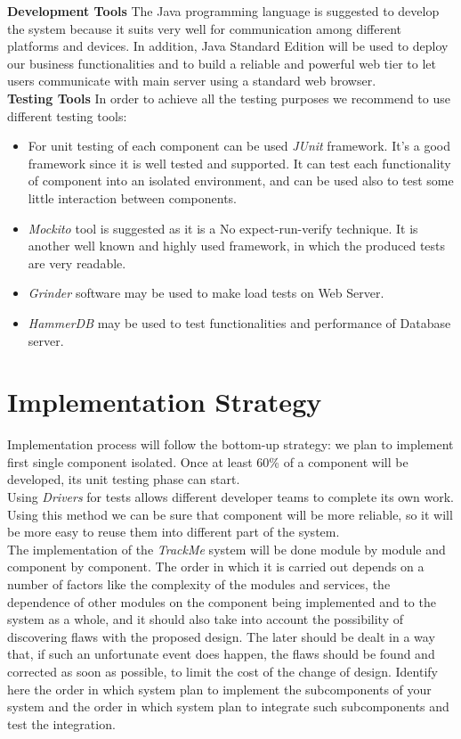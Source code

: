 \documentclass[a4paper, hidelinks, 12pt]{report}
\begin{document}
\textbf{Development Tools} The Java programming language is suggested to develop the system because it suits very well for communication among different platforms and devices. In addition, Java Standard Edition will be used to deploy our business functionalities and to build a reliable and powerful web tier to let users communicate with main server using a standard web browser. \\

\textbf{Testing Tools} In order to achieve all the testing purposes we recommend to use different testing tools:
\begin{itemize}
\item{} For unit testing of each component can be used \textit{JUnit} framework. It’s a good framework since it is well tested and supported. It can test each functionality of component into an isolated environment, and can be used also to test some little interaction between components.
\item{}\textit{Mockito} tool is suggested as it is a No expect-run-verify technique. It is another well known and highly used framework, in which the produced tests are very readable.
\item{} \textit{Grinder} software may be used to make load tests on Web Server.
\item{} \textit{HammerDB} may be used to test functionalities and performance of Database server.
\end{itemize}

\section{Implementation Strategy}
Implementation process will follow the bottom-up strategy: we plan to implement first single component isolated. Once at least 60\% of a component will be developed, its unit testing phase can start.\\

Using \textit{Drivers} for tests allows different developer teams to complete its own work. Using this method we can be sure that component will be more reliable, so it will be more easy to reuse them into different part of the system.\\

The implementation of the \textit{TrackMe} system will be done module by module and component by component. The order in which it is carried out depends on a number of factors like the complexity of the modules and services, the dependence of other modules on the component being implemented and to the system as a whole, and it should also take into account the possibility of discovering flaws with the proposed design. The later should be dealt in a way that, if such an unfortunate event does	happen, the flaws should be found and corrected as soon as possible, to limit the cost of the change of design. Identify here the order in which system plan to implement the subcomponents of your system and the order in which system plan to integrate such subcomponents and test the integration.\\
\end{document}
